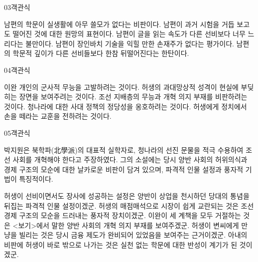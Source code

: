 \documentclass[fs85,seriesWit]{korfarm-base}
\begin{document}
\begin{kfQBlock}{03}{객관식}
\begin{kfChoices}
\kfChoice 남편의 학문이 실생활에 아무 쓸모가 없다는 비판이다.
\kfChoice 남편이 과거 시험을 거듭 보고도 떨어진 것에 대한 원망의 표현이다.
\kfChoice 남편이 글을 읽는 속도가 다른 선비보다 너무 느리다는 불만이다.
\kfChoice 남편이 장인바치 기술을 익힐 만한 손재주가 없다는 평가이다.
\kfChoice 남편의 학문적 깊이가 다른 선비들보다 한참 뒤떨어진다는 한탄이다.
\end{kfChoices}
\end{kfQBlock}

\begin{kfQBlock}{04}{객관식}
\begin{kfChoices}
\kfChoice 이완 개인의 군사적 무능을 고발하려는 것이다.
\kfChoice 허생의 과대망상적 성격이 현실에 부딪히는 장면을 보여주려는 것이다.
\kfChoice 조선 지배층의 무능과 개혁 의지 부재를 비판하려는 것이다.
\kfChoice 청나라에 대한 사대 정책의 정당성을 옹호하려는 것이다.
\kfChoice 허생에게 정치에서 손을 떼라는 교훈을 전하려는 것이다.
\end{kfChoices}
\end{kfQBlock}

\begin{kfQBlock}{05}{객관식}
\begin{kfEvidence}박지원은 북학파(北學派)의 대표적 실학자로, 청나라의 선진 문물을 적극 수용하여 조선 사회를 개혁해야 한다고 주장하였다. 그의 소설에는 당시 양반 사회의 허위의식과 경제 구조의 모순에 대한 날카로운 비판이 담겨 있으며, 파격적 인물 설정과 풍자적 기법이 특징적이다.\end{kfEvidence}
\begin{kfChoices}
\kfChoice 허생이 선비이면서도 장사에 성공하는 설정은 양반이 상업을 천시하던 당대의 통념을 뒤집는 파격적 인물 설정이겠군.
\kfChoice 허생의 매점매석으로 시장이 쉽게 교란되는 것은 조선 경제 구조의 모순을 드러내는 풍자적 장치이겠군.
\kfChoice 이완이 세 계책을 모두 거절하는 것은 <보기>에서 말한 양반 사회의 개혁 의지 부재를 보여주겠군.
\kfChoice 허생이 변씨에게 만 냥을 빌리는 것은 당시 금융 제도가 완비되어 있었음을 보여주는 근거이겠군.
\kfChoice 아내의 비판에 허생이 바로 밖으로 나가는 것은 실천 없는 학문에 대한 반성이 계기가 된 것이겠군.
\end{kfChoices}
\end{kfQBlock}
\end{document}
